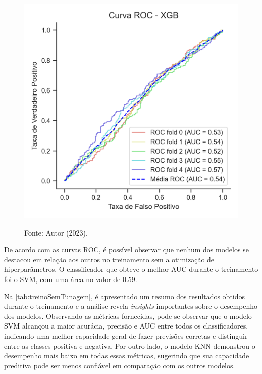 \begin{figure}
\begin{minipage}[t]{0.28\textwidth}
	\end{minipage}
	\hfill
	\begin{minipage}[t]{0.28\textwidth}
		\centering
		\includegraphics[width=\textwidth]{USPSC-img/Curva ROC - XGB.png}
	\end{minipage}
	
	\begin{center}
		Fonte: Autor (2023).
	\end{center}
\end{figure}

De acordo com as curvas ROC, é possível observar que nenhum dos modelos se destacou em relação aos outros no treinamento sem a otimização de hiperparâmetros. O classificador que obteve o melhor AUC durante o treinamento foi o SVM, com uma área no valor de 0.59.

Na \autoref{tab:treinoSemTunagem}, é apresentado um resumo dos resultados obtidos durante o treinamento e a análise revela \textit{insights} importantes sobre o desempenho dos modelos. Observando as métricas fornecidas, pode-se observar que o modelo SVM alcançou a maior acurácia, precisão e AUC entre todos os classificadores, indicando uma melhor capacidade geral de fazer previsões corretas e distinguir entre as classes positiva e negativa. Por outro lado, o modelo KNN demonstrou o desempenho mais baixo em todas essas métricas, sugerindo que sua capacidade preditiva pode ser menos confiável em comparação com os outros modelos.

